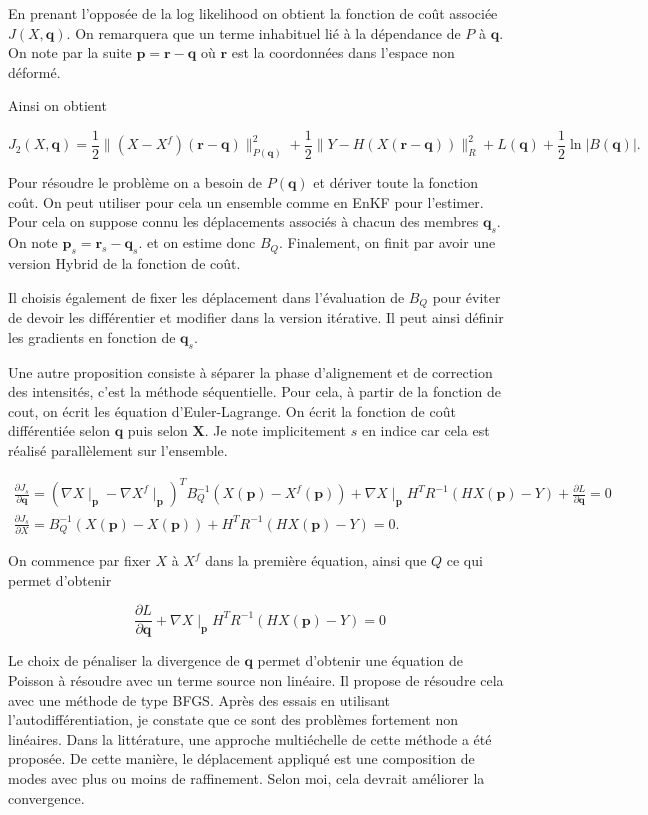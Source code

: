 \documentclass{article}
\newcommand{\norm}[1]{\|#1\|}
\newcommand{\bX}{\bm{X}}
\newcommand{\bq}{\bm{q}}
\newcommand{\bp}{\bm{p}}
\newcommand{\br}{\bm{r}}
\begin{document}
En prenant l'opposée de la log likelihood on obtient la fonction de coût associée $J(X, \bq)$. On remarquera que un terme inhabituel lié à la dépendance de $P$ à $\bq$. On note par la suite $\bp = \br - \bq$ où $\br$ est la coordonnées dans l'espace non déformé.

Ainsi on obtient

$$
    J_2(X, \bq) = \frac12 \norm{(X - X^f)(\br - \bq)}^2_{P(\bq)} + \frac12 \norm{Y - H(X(\br - \bq))}^2_{R} + L(\bq) + \frac12 \ln{|B(\bq)|}.
$$

Pour résoudre le problème on a besoin de $P(\bq)$ et dériver toute la fonction coût. On peut utiliser pour cela un ensemble comme en EnKF pour l'estimer.
Pour cela on suppose connu les déplacements associés  à chacun des membres $\bq_s$. On note $\bp_s = \br_s - \bq_s$. et on estime donc $B_Q$. Finalement, on finit par avoir une version Hybrid de la fonction de coût.

Il choisis également de fixer les déplacement dans l'évaluation de $B_Q$ pour éviter de devoir les différentier et modifier dans la version itérative. Il peut ainsi définir les gradients en fonction de $\bq_s$.

Une autre proposition consiste à séparer la phase d'alignement et de correction des intensités, c'est la méthode séquentielle. Pour cela, à partir de la fonction de cout, on écrit les équation d'Euler-Lagrange. On écrit la fonction de coût différentiée selon $\bq$ puis selon $\bX$. Je note implicitement $s$ en indice car cela est réalisé parallèlement sur l'ensemble.


\begin{eqnarray*}
    \frac{\partial J_s}{\partial \bq} = (\nabla X \mid_{\bp} - \nabla X^f \mid_{\bp})^T B_Q^{-1} (X(\bp) - X^f(\bp)) + \nabla X \mid_{\bp} H^T R^{-1} (H X(\bp) - Y) + \frac{\partial L}{\partial \bq} = 0 \\
    \frac{\partial J_s}{\partial X} =  B_Q^{-1}  (X(\bp) - X(\bp)) + H^T R^{-1} (H X(\bp) - Y) = 0.
\end{eqnarray*}

On commence par fixer $X$ à $X^f$ dans la première équation, ainsi que $Q$ ce qui permet d'obtenir

$$
    \frac{\partial L}{\partial \bq} + \nabla X \mid_{\bp} H^T R^{-1} (H X(\bp) - Y) = 0
$$

Le choix de pénaliser la divergence de $\mathbf{q}$ permet d'obtenir une équation de Poisson à résoudre avec un terme source non linéaire. Il propose de résoudre cela avec une méthode de type BFGS. Après des essais en utilisant l'autodifférentiation, je constate que ce sont des problèmes fortement non linéaires. Dans la littérature, une approche multiéchelle de cette méthode a été proposée. De cette manière, le déplacement appliqué est une composition de modes avec plus ou moins de raffinement. Selon moi, cela devrait améliorer la convergence.
\end{document}
